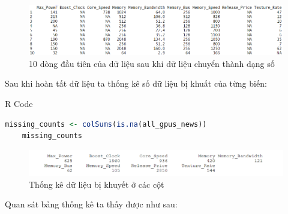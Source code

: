 \documentclass[a4paper]{article}
\begin{document}
\newpage
            \begin{figure}[H]
                \centering
                \includegraphics[width=0.7\linewidth]{4. GPU/Console/console3.png}
                \caption{10 dòng đầu tiên của dữ liệu sau khi dữ liệu chuyển thành dạng số}
            \end{figure}
            \vspace{-18pt}
            \hspace{1pt}
            Sau khi hoàn tất dữ liệu ta thống kê số dữ liệu bị khuất của từng biến:
\begin{mybox}{R Code}
    \begin{lstlisting}[language={R}]
    missing_counts <- colSums(is.na(all_gpus_news))
    missing_counts
    \end{lstlisting}
\end{mybox}
            \vspace{-10pt}
            \begin{figure}[!h]
                \vspace{-4pt}
                \centering
                \includegraphics[width=0.8\linewidth]{4. GPU/Console/console4.png}
                \caption{Thống kê dữ liệu bị khuyết ở các cột}
            \end{figure}
            \vspace{-16pt}
            \hspace{1pt}
            Quan sát bảng thống kê ta thấy được như sau:
\end{document}

